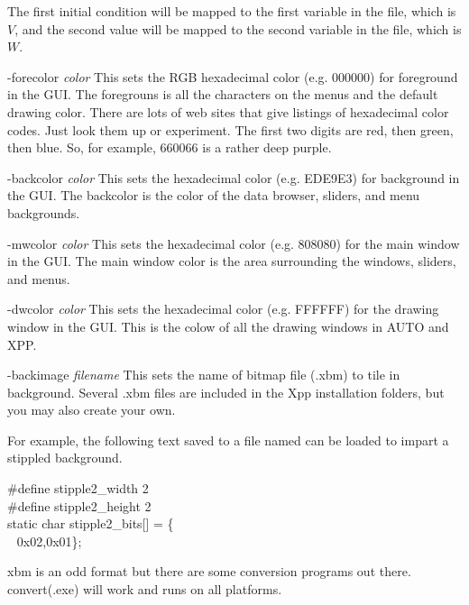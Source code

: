 \begin{description}
\begin{center}
\begin{minipage}{55ex}
\begin{tabular}{l}
\end{tabular}
\end{minipage}
\end{center}
The first initial condition will be mapped to the first variable in the {} file, which is $V$, and the second value will be mapped to the second variable in the {} file, which is $W$. 
\item{-forecolor \emph{color}} This sets the RGB hexadecimal color (e.g. 000000) for foreground in the GUI. The foregrouns is all the characters on the menus and the default drawing color. There are lots of web sites that give listings of hexadecimal color codes. Just look them up or experiment. The first two digits are red, then green, then blue. So, for example, 660066 is a rather deep purple.  
\item{-backcolor \emph{color}} This sets the hexadecimal color (e.g. EDE9E3) for background in the GUI. The backcolor is the color of the data browser, sliders, and menu backgrounds.
\item{-mwcolor \emph{color}} This sets the hexadecimal color (e.g. 808080) for the main window in the GUI. The main window color is the area surrounding the windows, sliders, and menus.
\item{-dwcolor \emph{color}} This sets the hexadecimal color (e.g. FFFFFF) for the drawing window in the GUI. This is the colow of all the drawing windows in AUTO and XPP. 
\item{-backimage \emph{filename}} This sets the name of bitmap file (.xbm) to tile in background. Several .xbm files are included in the Xpp installation folders, but you may also create your own. 
\begin{center}\begin{minipage}{65ex}
For example, the following text saved to a file named {}
can be loaded to impart a stippled background.
\begin{center}\ttfamily\begin{minipage}{40ex}
\#define stipple2\_width 2 \\
\#define stipple2\_height 2 \\
static char stipple2\_bits[] = \{ \\
$~~$ 0x02,0x01\};
\end{minipage}\end{center}
\end{minipage}\end{center}
xbm is an odd format but there are some conversion programs out there. convert(.exe) will work and runs on all platforms. 

\end{description}
